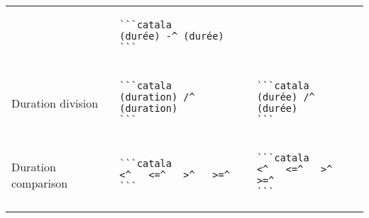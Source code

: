 \documentclass[a3paper,landscape]{article}
\begin{document}
\begin{multicols*}{2}
\begin{center}
\begin{tabular}{p{}p{}p{}}
      \vspace*{-1.75em}
                                      &
      \vspace*{-1.75em}
      \begin{verbatim}
```catala
(durée) -^ (durée)
```
\end{verbatim}
      \vspace*{-1.75em}
      \\
      Duration division               &
      \vspace*{-1.75em}
      \begin{verbatim}
```catala
(duration) /^ (duration)
```
\end{verbatim}
      \vspace*{-1.75em}
                                      &
      \vspace*{-1.75em}
      \begin{verbatim}
```catala
(durée) /^ (durée)
```
\end{verbatim}
      \vspace*{-1.75em}
      \\
      Duration comparison             &
      \vspace*{-1.75em}
      \begin{verbatim}
```catala
<^   <=^   >^   >=^
```
\end{verbatim}
      \vspace*{-1.75em}
                                      &
      \vspace*{-1.75em}
      \begin{verbatim}
```catala
<^   <=^   >^   >=^
```
\end{verbatim}
      \vspace*{-1.75em}
      \\
      \bottomrule
    \end{tabular}
  \end{center}



\end{multicols*}
\end{document}
